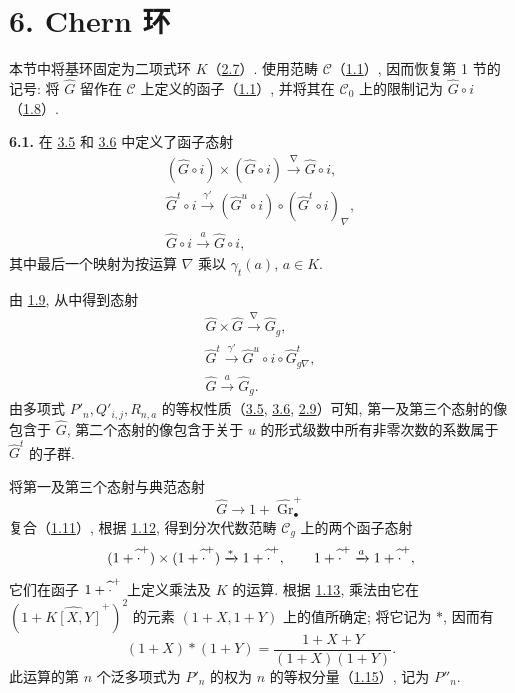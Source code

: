 \section*{6. Chern 环}

本节中将基环固定为二项式环 \(K\)（\hyperlink{sga6.e05.def.2-7}{2.7}）. 使用范畴 \(\mathcal C\)（\hyperlink{sga6.e05.para.1-1}{1.1}）, 因而恢复第 1 节的记号: 将 \(\widehat G\) 留作在 \(\mathcal C\) 上定义的函子（\hyperlink{sga6.e05.para.1-1}{1.1}）, 并将其在 \(\mathcal C_0\) 上的限制记为 \(\widehat G\circ i\)（\hyperlink{sga6.e05.para.1-8}{1.8}）.

\textbf{6.1.} 在 \hyperlink{sga6.e05.para.3-5}{3.5} 和 \hyperlink{sga6.e05.para.3-6}{3.6} 中定义了函子态射
\[
 \begin{gathered}
 (\widehat G\circ i)\times(\widehat G\circ i)
     \xrightarrow{\nabla}\widehat G\circ i,\\
 \widehat G^t\circ i\xrightarrow{\gamma'}
     (\widehat G^u\circ i)\circ(\widehat G^t\circ i)_{\nabla},\\
 \widehat G\circ i\xrightarrow{a}\widehat G\circ i,
 \end{gathered}
\]
其中最后一个映射为按运算 \(\nabla\) 乘以 \(\gamma_t(a)\), \(a\in K\).

由 \hyperlink{sga6.e05.lem.1-9}{1.9}, 从中得到态射
\[
 \begin{gathered}
 \widehat G\times\widehat G\xrightarrow{\nabla}\widehat G_g,\\
 \widehat G^t\xrightarrow{\gamma'}
     \widehat G^u\circ i\circ\widehat G^t_{g\nabla},\\
 \widehat G\xrightarrow{a}\widehat G_g.
 \end{gathered}
\]
由多项式 \(P'_n,Q'_{i,j},R_{n,a}\) 的等权性质（\hyperlink{sga6.e05.para.3-5}{3.5}, \hyperlink{sga6.e05.para.3-6}{3.6}, \hyperlink{sga6.e05.para.2-9}{2.9}）可知, 第一及第三个态射的像包含于 \(\widehat G\), 第二个态射的像包含于关于 \(u\) 的形式级数中所有非零次数的系数属于 \(\widehat G^t\) 的子群.

将第一及第三个态射与典范态射
\[
 \widehat G\longrightarrow1+\widehat{\operatorname{Gr}}_{\bullet}^{+}
\]
复合（\hyperlink{sga6.e05.para.1-11}{1.11}）, 根据 \hyperlink{sga6.e05.lem.1-12}{1.12}, 得到分次代数范畴 \(\mathcal C_g\) 上的两个函子态射
\[
 (1+\widehat{\vphantom A\cdot}^{+})\times
 (1+\widehat{\vphantom A\cdot}^{+})
 \xrightarrow{*}1+\widehat{\vphantom A\cdot}^{+},
 \qquad
 1+\widehat{\vphantom A\cdot}^{+}
 \xrightarrow{a}1+\widehat{\vphantom A\cdot}^{+},
\]
它们在函子 \(1+\widehat{\vphantom A\cdot}^{+}\) 上定义乘法及 \(K\) 的运算. 根据 \hyperlink{sga6.e05.thm.1-13}{1.13}, 乘法由它在 \((1+\widehat{K[X,Y]}^{+})^2\) 的元素 \((1+X,1+Y)\) 上的值所确定; 将它记为 \(*\), 因而有
\begin{equation}\tag{6.1.1}
 (1+X)*(1+Y)=\frac{1+X+Y}{(1+X)(1+Y)}.
\end{equation}
此运算的第 \(n\) 个泛多项式为 \(P'_n\) 的权为 \(n\) 的等权分量（\hyperlink{sga6.e05.para.1-15}{1.15}）, 记为 \(P''_n\).


